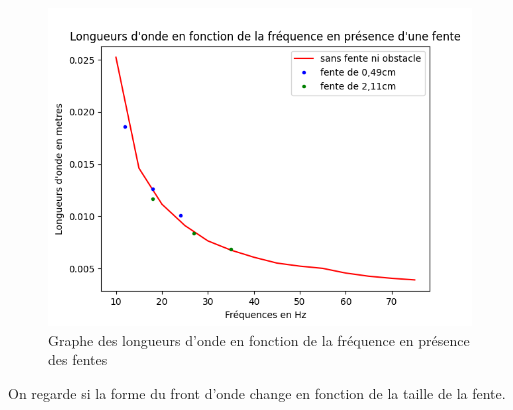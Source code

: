 \documentclass{report}
\begin{document}
\begin{figure}[H]
    \centering
    \includegraphics[scale=0.9]{fiddif.png}
    \caption{Graphe des longueurs d'onde en fonction de la fréquence en présence des fentes}
    \label{fig:enter-label}
\end{figure}

On regarde si la forme du front d'onde change en fonction de la taille de la fente. 
\end{document}
